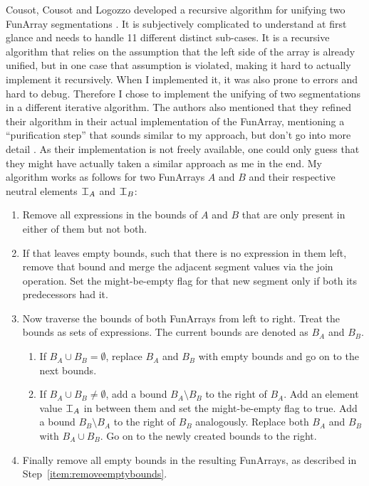 \documentclass{report}
\newcommand\nElement{\mathrlap{\perp}\top}
\begin{document}
Cousot, Cousot and Logozzo developed a recursive algorithm for unifying two FunArray segmentations \cite{cousot2011}. It is subjectively complicated to understand at first glance and needs to handle 11 different distinct sub-cases. It is a recursive algorithm that relies on the assumption that the left side of the array is already unified, but in one case that assumption is violated, making it hard to actually implement it recursively. When I implemented it, it was also prone to errors and hard to debug. Therefore I chose to implement the unifying of two segmentations in a different iterative algorithm. The authors also mentioned that they refined their algorithm in their actual implementation of the FunArray, mentioning a ``purification step'' that sounds similar to my approach, but don't go into more detail \cite[section 12.2]{cousot2011}. As their implementation is not freely available, one could only guess that they might have actually taken a similar approach as me in the end. My algorithm works as follows for two FunArrays $A$ and $B$ and their respective neutral elements $\nElement_A$ and $\nElement_B$:
\begin{enumerate}
  \item  Remove all expressions in the bounds of $A$ and $B$ that are only present in either of them but not both.
  \item \label{item:removeemptybounds} If that leaves empty bounds, such that there is no expression in them left, remove that bound and merge the adjacent segment values via the join operation. Set the might-be-empty flag for that new segment only if both its predecessors had it.
  \item Now traverse the bounds of both FunArrays from left to right. Treat the bounds as sets of expressions. The current bounds are denoted as $B_A$ and $B_B$.
  \begin{enumerate}[label*=\arabic*.]
    \item If $B_A \cup B_B = \emptyset$, replace $B_A$ and $B_B$ with empty bounds and go on to the next bounds.
    \item If $B_A \cup B_B \neq \emptyset$, add a bound $B_A \setminus B_B$ to the right of $B_A$. Add an element value $\nElement_A$ in between them and set the might-be-empty flag to true. Add a bound $B_B \setminus B_A$ to the right of $B_B$ analogously. Replace both $B_A$ and $B_B$ with $B_A \cup B_B$. Go on to the newly created bounds to the right.
  \end{enumerate}
  \item Finally remove all empty bounds in the resulting FunArrays, as described in Step~\ref{item:removeemptybounds}.
\end{enumerate}
\end{document}
